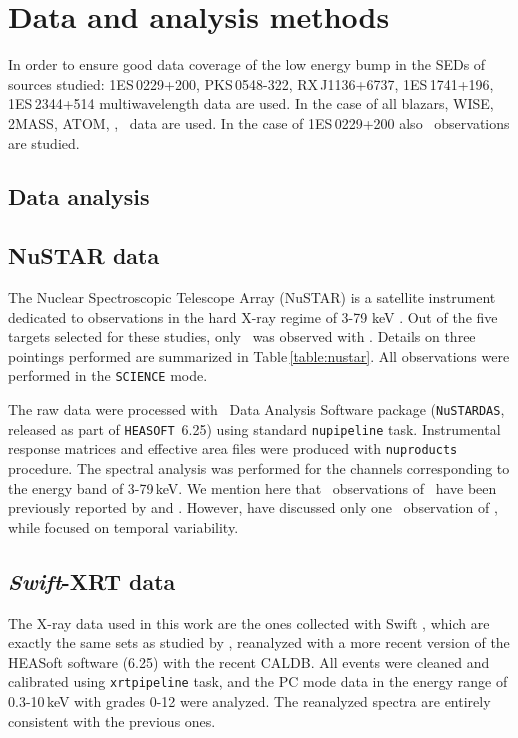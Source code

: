 \section{Data and  analysis methods} \label{data}

In order to ensure good data coverage of the low energy bump in the SEDs of  sources studied: 1ES\,0229+200, PKS\,0548-322, RX\,J1136+6737, 1ES\,1741+196, 1ES\,2344+514
multiwavelength data are used. In the case of all blazars, WISE, 2MASS, ATOM, \uvot, \xrt\ data are used. In the case of 1ES\,0229+200 also \nus\ observations are studied. 


\subsection{Data analysis}


\subsection*{NuSTAR data}

The Nuclear Spectroscopic Telescope Array (NuSTAR) is a satellite instrument dedicated to observations in the hard X-ray regime of 3-79 keV \citep{Harrison2013}.
Out of the five targets selected for these studies, only \one\ was observed with \nus. Details on three pointings performed are summarized in Table\,\ref{table:nustar}.
All observations were performed in the \verb|SCIENCE| mode.

The raw data were processed with \nus\ Data Analysis Software package
(\verb|NuSTARDAS|, 
released as part of
\verb|HEASOFT|~6.25)
using standard 
\verb|nupipeline|
task. 
Instrumental response matrices and effective area files were produced with
\verb|nuproducts|
procedure. 
The spectral analysis was performed for the channels corresponding to the energy band of 3-79\,keV. 
We mention here that \nus\ observations of \one\ have been previously reported by \cite{Bhatta_0229} and \cite{Pandey_0229}.
However, \cite{Bhatta_0229} have discussed only one \nus\ observation of \one, while \cite{Pandey_0229} focused on temporal variability.








\subsection*{\textit{Swift}-XRT data}
The X-ray data used in this work are the ones collected with Swift \citep{Gehrels}, which are exactly the same sets as studied by \cite{Wierzcholska2016}, reanalyzed with a more recent version of the HEASoft software (6.25) with the recent CALDB. %
All events were cleaned and calibrated using \verb|xrtpipeline| task, and the PC mode data in the energy range of 0.3-10\,keV with grades 0-12 were analyzed.
The reanalyzed spectra are entirely consistent with the previous ones.

